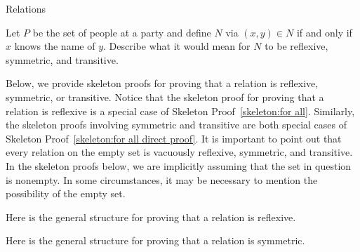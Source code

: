 \begin{section}{Relations}
\begin{problem}
Let $P$ be the set of people at a party and define $N$ via $(x,y)\in N$ if and only if $x$ knows the name of $y$.  Describe what it would mean for $N$ to be reflexive, symmetric, and transitive.
\end{problem}

Below, we provide skeleton proofs for proving that a relation is reflexive, symmetric, or transitive.  Notice that the skeleton proof for proving that a relation is reflexive is a special case of Skeleton Proof~\ref{skeleton:for all}. Similarly, the skeleton proofs involving symmetric and transitive are both special cases of Skeleton Proof~\ref{skeleton:for all direct proof}. It is important to point out that every relation on the empty set is vacuously reflexive, symmetric, and transitive.  In the skeleton proofs below, we are implicitly assuming that the set in question is nonempty.  In some circumstances, it may be necessary to mention the possibility of the empty set.

\begin{skeleton}
Here is the general structure for proving that a relation is reflexive. 
\begin{center}
\end{center}
\end{skeleton}

\begin{skeleton}
Here is the general structure for proving that a relation is symmetric.
\begin{center}
\end{center}
\end{skeleton}


\end{section}
